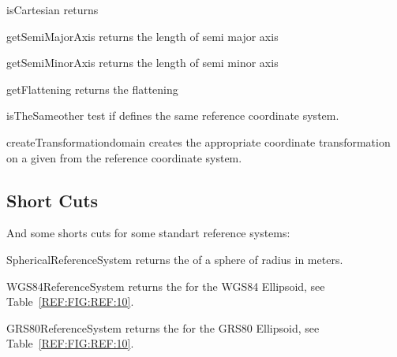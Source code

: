 \begin{methoddesc}[GeodeticReferenceSystem]{isCartesian}{}
returns \False 
\end{methoddesc}


\begin{methoddesc}[GeodeticReferenceSystem]{getSemiMajorAxis}{}
returns the length of semi major axis
\end{methoddesc}

\begin{methoddesc}[GeodeticReferenceSystem]{getSemiMinorAxis}{}
returns the length of semi minor axis
\end{methoddesc}

\begin{methoddesc}[GeodeticReferenceSystem]{getFlattening}{}
returns the flattening
\end{methoddesc}


\begin{methoddesc}[GeodeticReferenceSystem]{isTheSame}{other}
test if  defines the same reference coordinate system.
\end{methoddesc}


\begin{methoddesc}[GeodeticReferenceSystem]{createTransformation}{domain}
creates the appropriate coordinate transformation   on a given 
from the reference coordinate system.
\end{methoddesc}

\subsection{Short Cuts} 
And some shorts cuts for some standart reference systems:
\begin{funcdesc}{SphericalReferenceSystem}{}
returns the  of a sphere of radius  in meters.
\end{funcdesc}

\begin{funcdesc}{WGS84ReferenceSystem}{}
returns the  for the WGS84 Ellipsoid, see Table~\ref{REF:FIG:REF:10}.
\end{funcdesc}

\begin{funcdesc}{GRS80ReferenceSystem}{}
returns the  for the GRS80 Ellipsoid, see Table~\ref{REF:FIG:REF:10}.
\end{funcdesc}


